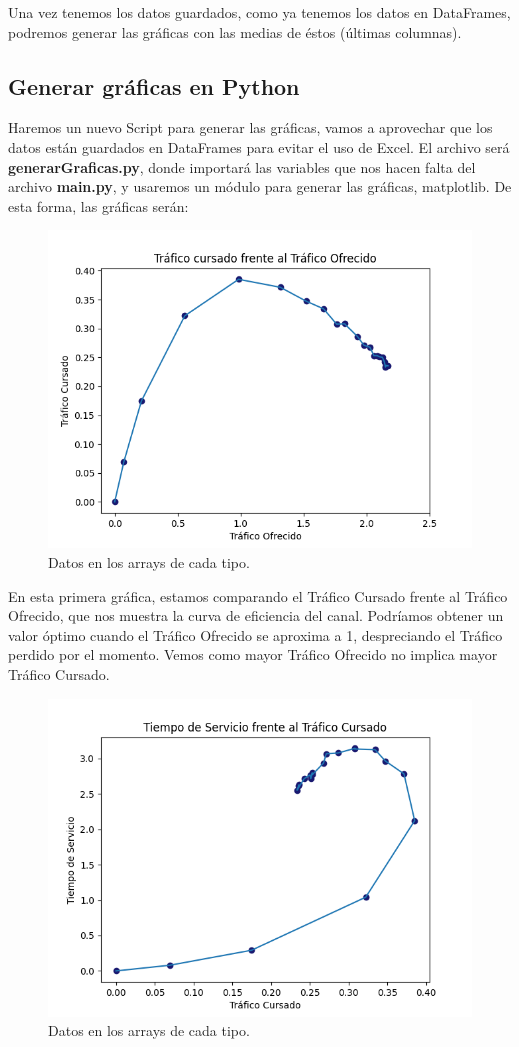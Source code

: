 \documentclass{article}
\begin{document}
Una vez tenemos los datos guardados, como ya tenemos los datos en DataFrames, podremos generar las gráficas con las medias de éstos (últimas columnas).

\subsection{Generar gráficas en Python}

Haremos un nuevo Script para generar las gráficas, vamos a aprovechar que los datos están guardados en DataFrames para evitar el uso de Excel. El archivo será \textbf{generarGraficas.py}, donde importará las variables que nos hacen falta del archivo \textbf{main.py}, y usaremos un módulo para generar las gráficas, matplotlib. De esta forma, las gráficas serán:
\newpage
\begin{figure}[h]
    \centering
    \includegraphics[width=0.7\linewidth]{src/TCvsTO.png}
    \caption{\label{fig:TCvsTO} Datos en los arrays de cada tipo.}
\end{figure}

En esta primera gráfica, estamos comparando el Tráfico Cursado frente al Tráfico Ofrecido, que nos muestra la curva de eficiencia del canal. Podríamos obtener un valor óptimo cuando el Tráfico Ofrecido se aproxima a 1, despreciando el Tráfico perdido por el momento. Vemos como mayor Tráfico Ofrecido no implica mayor Tráfico Cursado.

\begin{figure}[h]
    \centering
    \includegraphics[width=0.7\linewidth]{src/TSvsTC.png}
    \caption{\label{fig:TSvsTC} Datos en los arrays de cada tipo.}
\end{figure}
\end{document}
